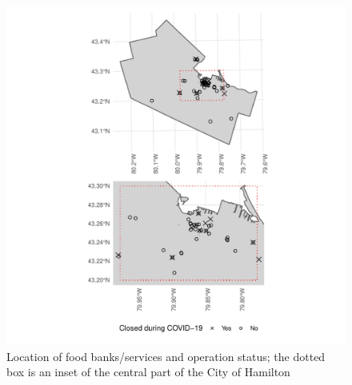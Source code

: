 \documentclass[]{elsarticle} %
\providecommand{\DIFdelend}{} %
\providecommand{\DIFaddbeginFL}{} %
\providecommand{\DIFaddendFL}{} %
\providecommand{\DIFdelbeginFL}{} %
\providecommand{\DIFdelendFL}{} %
\newcommand{\DIFscaledelfig}{0.5}
\newlength{\DIFdelgraphicswidth} %
\newlength{\DIFdelgraphicsheight} %
\newcommand{\DIFaddincludegraphics}[2][]{{\color{blue}\fbox{\DIFOincludegraphics[#1]{#2}}}} %
\newcommand{\DIFdelincludegraphics}[2][]{%
\sbox{\DIFdelgraphicsbox}{\DIFOincludegraphics[#1]{#2}}%
\settoboxwidth{\DIFdelgraphicswidth}{\DIFdelgraphicsbox} %
\settoboxtotalheight{\DIFdelgraphicsheight}{\DIFdelgraphicsbox} %
\scalebox{\DIFscaledelfig}{%
\parbox[b]{\DIFdelgraphicswidth}{\usebox{\DIFdelgraphicsbox}\\[-\baselineskip] \rule{\DIFdelgraphicswidth}{0em}}\llap{\resizebox{\DIFdelgraphicswidth}{\DIFdelgraphicsheight}{%
\setlength{\unitlength}{\DIFdelgraphicswidth}%
\begin{picture}(1,1)%
\thicklines\linethickness{2pt} %
{\color[rgb]{1,0,0}\put(0,0){\framebox(1,1){}}}%
{\color[rgb]{1,0,0}\put(0,0){\line( 1,1){1}}}%
{\color[rgb]{1,0,0}\put(0,1){\line(1,-1){1}}}%
\end{picture}%
}\hspace*{3pt}}} %
} %
\DeclareRobustCommand{\DIFdelend}{\DIFOaddend \let\includegraphics\DIFOincludegraphics} %
\DeclareRobustCommand{\DIFaddbeginFL}{\DIFOaddbeginFL \let\includegraphics\DIFaddincludegraphics} %
\DeclareRobustCommand{\DIFaddendFL}{\DIFOaddendFL \let\includegraphics\DIFOincludegraphics} %
\DeclareRobustCommand{\DIFdelbeginFL}{\DIFOdelbeginFL \let\includegraphics\DIFdelincludegraphics} %
\DeclareRobustCommand{\DIFdelendFL}{\DIFOaddendFL \let\includegraphics\DIFOincludegraphics} %
\begin{document}
\DIFdelend \begin{figure}
\DIFdelbeginFL %
\DIFdelendFL \DIFaddbeginFL \includegraphics[width=1\linewidth]{Accessibility-Foodbanks-Hamilton_files/figure-latex/plot-location-foodbanks-1} \DIFaddendFL \caption{\label{fig:foodbanks}Location of food banks/services and operation status; the dotted box is an inset of the central part of the City of Hamilton}\label{fig:plot-location-foodbanks}
\end{figure}
\end{document}
